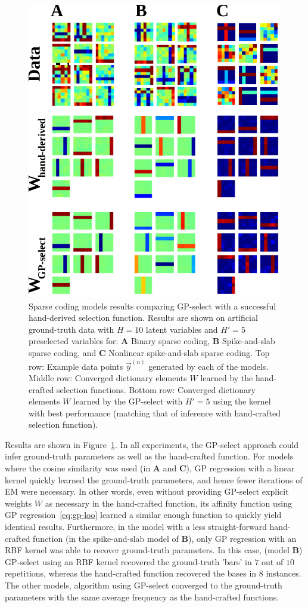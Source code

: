 \begin{figure}[t]
\begin{center}
\includegraphics[width=.45\textwidth]{figs/sparsecoding/bars-test.pdf}
\caption{Sparse coding models results comparing GP-select with a successful hand-derived selection function.
Results are shown on artificial ground-truth data with $H=10$ latent variables and $H'=5$ preselected variables for: \textbf{A} Binary sparse coding, \textbf{B} Spike-and-slab sparse coding, and \textbf{C} Nonlinear spike-and-slab sparse coding.
Top row: Example data points $\vec{y}^{(n)}$ generated by each of the models.
Middle row: Converged dictionary elements $W$ learned by the hand-crafted selection functions.
Bottom row: Converged dictionary elements $W$ learned by the GP-select with $H'=5$ using the kernel with best performance (matching that of inference with hand-crafted selection function).
}\label{fig:sparse}
\end{center}
\end{figure}

Results are shown in Figure~\ref{fig:sparse}.
In all experiments, the GP-select approach could infer ground-truth parameters as well as the hand-crafted function.
For models where the cosine similarity was used (in \textbf{A} and \textbf{C}), GP regression with a linear kernel quickly learned the ground-truth parameters, and hence fewer iterations of EM were necessary.
In other words, even without providing GP-select explicit weights $W$ as necessary in the hand-crafted function, its affinity function using GP regression~\eqref{eq:gp-loo} learned a similar enough function to quickly yield identical results.
Furthermore, in the model with a less straight-forward hand-crafted function (in the spike-and-slab model of \textbf{B}), only GP regression with an RBF kernel was able to recover ground-truth parameters.
In this case, (model \textbf{B}) GP-select using an RBF kernel recovered the ground-truth 'bars' in $7$ out of $10$ repetitions, whereas the hand-crafted function recovered the bases in $8$ instances.
The other models, algorithm using GP-select converged to the ground-truth parameters with the same average frequency as the hand-crafted functions.

